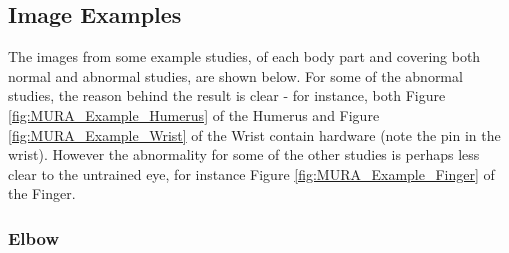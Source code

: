 \documentclass[11pt]{article} %
\theoremstyle{plain}
\theoremstyle{definition}
\begin{document}
\subsection{Image Examples}
The images from some example studies, of each body part and covering both normal and abnormal studies, are shown below. For some of the abnormal studies, the reason behind the result is clear - for instance, both Figure \ref{fig:MURA_Example_Humerus} of the Humerus and Figure \ref{fig:MURA_Example_Wrist} of the Wrist contain hardware (note the pin in the wrist). However the abnormality for some of the other studies is perhaps less clear to the untrained eye, for instance Figure \ref{fig:MURA_Example_Finger} of the Finger.

\newpage
\subsubsection{Elbow}
\end{document}
